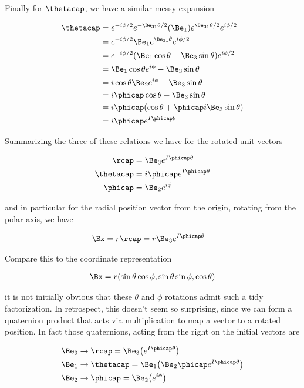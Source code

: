 Finally for $\thetacap$, we have a similar messy expansion

\begin{align*}
\thetacap 
&= e^{-i \phi/2} e^{-\Be_{31}\theta/2} (\Be_1) e^{\Be_{31}\theta/2} e^{i\phi/2} \\
&= e^{-i \phi/2} \Be_1 e^{\Be_{31}\theta} e^{i\phi/2} \\
&= e^{-i \phi/2} (\Be_1 \cos\theta - \Be_3 \sin\theta) e^{i\phi/2} \\
&= \Be_1 \cos\theta e^{i\phi} - \Be_3 \sin\theta \\
&= i \cos\theta \Be_2 e^{i\phi} - \Be_3 \sin\theta \\
&= i \phicap \cos\theta - \Be_3 \sin\theta \\
&= i \phicap (\cos\theta + \phicap i \Be_3 \sin\theta) \\
&= i \phicap e^{I\phicap\theta}
\end{align*}

Summarizing the three of these relations we have for the rotated unit vectors

\begin{align}\label{eqn:sphericalPolarUnit:foo5}
\rcap &= \Be_3 e^{I \phicap \theta} \\
\thetacap &= i \phicap e^{I \phicap \theta} \\
\phicap &= \Be_2 e^{i\phi} 
\end{align}

and in particular for the radial position vector from the origin, rotating from the polar axis, we have

\begin{align}\label{eqn:sphericalPolarUnit:foo6}
\Bx &= r \rcap = r \Be_3 e^{I\phicap \theta}
\end{align}

Compare this to the coordinate representation

\begin{align}\label{eqn:sphericalPolarUnit:foo7}
\Bx = r(\sin\theta \cos\phi, \sin\theta \sin\phi, \cos\theta)
\end{align}

it is not initially obvious that these $\theta$ and $\phi$ rotations admit such a tidy factorization.  In retrospect, this doesn't seem so surprising, since we can form a quaternion product that acts via multiplication to map a vector to a rotated position.  In fact those quaternions, acting from the right on the initial vectors are 

\begin{align}\label{eqn:sphericalPolarUnit:foo8}
\Be_3 &\rightarrow \rcap = \Be_3 \bigl( e^{I \phicap \theta} \bigr) \\
\Be_1 &\rightarrow \thetacap = \Be_1 \bigl( \Be_2 \phicap e^{I \phicap \theta} \bigr) \\
\Be_2 &\rightarrow \phicap = \Be_2 \bigl( e^{i\phi} \bigr)
\end{align}

